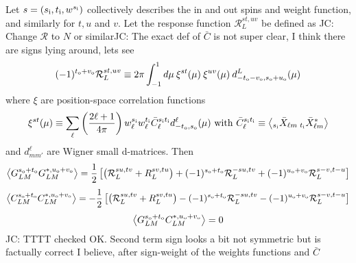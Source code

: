 \documentclass[reprint,prd, superscriptaddress, tightenlines, longbibliography, nofootinbib, eqsecnum, amsfonts, amsmath, floatfix, notitlepage, onecolumn]{revtex4-1}
\newcommand{\si}[0]{{s_{\rm i}}}
\newcommand{\ti}[0]{{t_{\rm i}}}
\newcommand{\so}[0]{{s_{\rm o}}}
\renewcommand{\to}[0]{{t_{\rm o}}}
\newcommand{\uo}[0]{{u_{\rm o}}}
\newcommand{\vo}[0]{{v_{\rm o}}}
\newcommand{\av}[1]{\left\langle #1 \right\rangle}
\newcommand{\JC}[1]{\color{red}JC: #1\color{black}}
\begin{document}
Let $s = (\si, \ti, w^{\si})$ collectively describes the in and out spins and weight function, and similarly for $t, u$ and $v$. Let the response function $\mathcal R^{st, uv}_L$ be defined as \JC{Change $\mathcal R $ to $N$ or similar}\JC{The exact def of $\bar C$ is not super clear, I think there are signs lying around, lets see}
\begin{equation}
(-1)^{\to + \vo} \mathcal R_L^{st,uv} \equiv 2\pi  \int_{-1}^1 d \mu \:\xi^{st}(\mu)\:\xi^{uv}(\mu)\: d^L_{-\to - \vo, \so + \uo}(\mu) 
\end{equation}
where $\xi$ are position-space correlation functions
\begin{equation}
\xi^{st}(\mu) \equiv  \sum_\ell \left(\frac{2\ell + 1}{4\pi}\right)w^\si_\ell w^\ti_\ell \bar C_\ell^{\si \ti} d^\ell_{-\to,\so}(\mu)\textrm{ with } \bar C_\ell^{\si \ti} \equiv \av{ _{\si}\bar X_{\ell m}\: _{\ti} \bar X^*_{\ell m} }
\end{equation}
and $d^\ell_{mm'}$ are Wigner small d-matrices.
Then
\begin{equation}
	\av{G^{\so + \to}_{LM} G^{*, \uo + \vo}_{L M} } = \frac 12\left[ \left(\mathcal R^{su, tv}_L  + R^{sv, tu}_L\right) + (-1)^{\so + \to} \mathcal R^{-su, tv}_L + (-1)^{\uo + \vo}\mathcal R_L^{s-v, t-u}  \right]
\end{equation}
\begin{equation}
	\av{C^{\so + \to}_{LM} C^{*, \uo + \vo}_{L M} } =- \frac 12\left[ \left(\mathcal R^{su, tv}_L  + R^{sv, tu}_L\right)  - (-1)^{\so + \to} \mathcal R^{-su, tv}_L -(-1)^{\uo + \vo} \mathcal R_L^{s-v, t-u} \right]
\end{equation}
\begin{equation}
	\av{G^{\so + \to}_{LM} C^{*, \uo + \vo}_{L M} } =0
\end{equation}
\JC{TTTT checked OK. Second term sign looks a bit not symmetric but is factually correct I believe, after sign-weight of the weights functions and $\bar C$}
\end{document}
